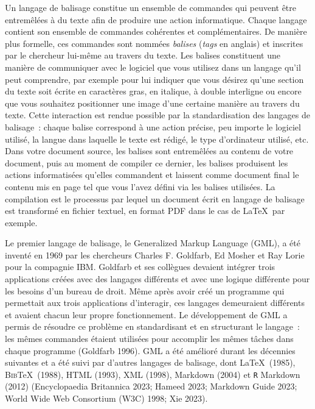 \documentclass[
  letterpaper,
]{scrbook}
\begin{document}
Un langage de balisage constitue un ensemble de commandes qui peuvent
être entremêlées à du texte afin de produire une action informatique.
Chaque langage contient son ensemble de commandes cohérentes et
complémentaires. De manière plus formelle, ces commandes sont nommées
\emph{balises} (\emph{tags} en anglais) et inscrites par le chercheur
lui-même au travers du texte. Les balises constituent une manière de
communiquer avec le logiciel que vous utilisez dans un langage qu'il
peut comprendre, par exemple pour lui indiquer que vous désirez qu'une
section du texte soit écrite en caractères gras, en italique, à double
interligne ou encore que vous souhaitez positionner une image d'une
certaine manière au travers du texte. Cette interaction est rendue
possible par la standardisation des langages de balisage~: chaque balise
correspond à une action précise, peu importe le logiciel utilisé, la
langue dans laquelle le texte est rédigé, le type d'ordinateur utilisé,
etc. Dans votre document source, les balises sont entremêlées au contenu
de votre document, puis au moment de compiler ce dernier, les balises
produisent les actions informatisées qu'elles commandent et laissent
comme document final le contenu mis en page tel que vous l'avez défini
via les balises utilisées. La compilation est le processus par lequel un
document écrit en langage de balisage est transformé en fichier textuel,
en format PDF dans le cas de \LaTeX~par exemple.

Le premier langage de balisage, le Generalized Markup Language (GML), a
été inventé en 1969 par les chercheurs Charles F. Goldfarb, Ed Mosher et
Ray Lorie pour la compagnie IBM. Goldfarb et ses collègues devaient
intégrer trois applications créées avec des langages différents et avec
une logique différente pour les besoins d'un bureau de droit. Même après
avoir créé un programme qui permettait aux trois applications
d'interagir, ces langages demeuraient différents et avaient chacun leur
propre fonctionnement. Le développement de GML a permis de résoudre ce
problème en standardisant et en structurant le langage~: les mêmes
commandes étaient utilisées pour accomplir les mêmes tâches dans chaque
programme (Goldfarb 1996). GML a été amélioré durant les décennies
suivantes et a été suivi par d'autres langages de balisage, dont
\LaTeX~(1985), \textsc{Bib}\TeX~(1988), HTML (1993), XML (1998),
Markdown (2004) et \texttt{R} Markdown (2012) (Encyclopaedia Britannica
2023; Hameed 2023; Markdown Guide 2023; World Wide Web Consortium (W3C)
1998; Xie 2023).
\end{document}
